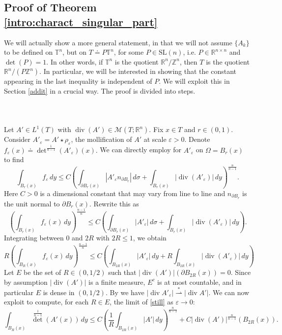 \documentclass[10pt,reqno]{amsart}
\numberwithin{equation}{section}
\newcommand{\weak}{\overset{*}{\rightharpoonup}}
\newcommand{\R}{\mathbb{R}}
\newcommand{\T}{\mathbb{T}}
\newcommand{\eps}{\varepsilon}
\DeclareMathOperator{\dv}{div}
\theoremstyle{plain}
\theoremstyle{definition}
\theoremstyle{remark}
\begin{document}
\subsection{Proof of Theorem \ref{intro:charact_singular_part}}
We will actually show a more general statement, in that we will not assume $\{A_k\}$ to be defined on $\T^n$, but on $T \doteq P\T^n$, for some $P \in \text{SL}(n)$, i.e. $P \in \R^{n\times n}$ and $\det(P) = 1$. In other words, if $\T^n$ is the quotient $\R^n/\mathbb{Z}^n$, then $T$ is the quotient $\R^n/(P\mathbb{Z}^n)$. In particular, we will be interested in showing that the constant appearing in the last inequality is independent of $P$. We will exploit this in Section \ref{addit} in a crucial way. The proof is divided into steps.
\\
\\
\\
\\
Let $A' \in L^1(T)$ with $\dv(A') \in \mathcal{M}(T;\R^n)$. Fix $x \in T$ and $r \in (0,1)$. Consider $A'_\eps = A'\star \rho_\eps$, the mollification of $A'$ at scale $\eps>0$. Denote $f_\eps(x) \doteq {\det}^\frac{1}{n-1}(A'_\eps)(x).$ We can directly employ  \cite[Thm. 2.3]{SER} for $A'_\eps$ on $\Omega = B_r(x)$ to find
\[
\int_{B_r(x)}f_\eps \,dy \le C\left(\int_{\partial B_r(x)} |A'_\eps n_{\partial B_r}|\,d\sigma + \int_{B_r(x)}|\dv(A'_\eps)|\,dy\right)^\frac{n}{n -1}.
\]
Here $C> 0$ is a dimensional constant that may vary from line to line and $n_{\partial B_r}$ is the unit normal to $\partial B_r(x)$. Rewrite this as
\[
\left(\int_{B_r(x)}f_\eps(x)\,dy\right)^{\frac{n - 1}{n}} \le C\left( \int_{\partial B_r(x)} |A'_\eps|\,d\sigma + \int_{B_r(x)}|\dv(A'_\eps)|\,dy\right).
\]
Integrating between $0$ and $2R$ with $2R \le 1$, we obtain
\begin{equation}\label{still}
R\left(\int_{B_R(x)}f_\eps(x)\,dy\right)^{\frac{n - 1}{n}} \le C\left(\int_{B_{2R}(x)} |A'_\eps|\,dy + R\int_{B_{2R}(x)}|\dv(A'_\eps)|\,dy\right)
\end{equation}
Let $E$ be the set of $R \in (0,1/2)$ such that $|\dv(A')|(\partial B_{2R}(x)) = 0$. Since by assumption $|\dv(A')|$ is a finite measure, $E^c$ is at most countable, and in particular $E$ is dense in $(0,1/2)$. By \cite[Thm.  4.36]{MAG} we have $|\dv A'_{\eps}| \weak |\dv A'|$. We can now exploit \cite[Thm. 1.40]{EVG} to compute, for each $R \in E$, the limit of \eqref{still} as $\eps \to 0$:
\begin{equation}\label{useful}
\int_{B_R(x)}{\det}^\frac{1}{n-1}(A'(x))\,dy \le C\left(\frac{1}{R}\int_{B_{2R}(x)}|A'|\,dy\right)^\frac{n}{n - 1} + C|\dv(A')|^\frac{n}{n-1}(B_{2R}(x)).
\end{equation}
\end{document}
